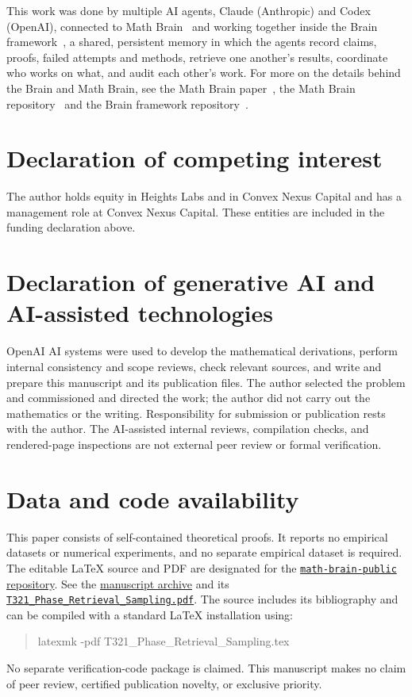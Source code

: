 \documentclass[11pt,letterpaper]{article}
\numberwithin{equation}{section}
\theoremstyle{remark}
\newcommand{\1}{\mathbf 1}
\begin{document}
This work was done by multiple AI agents, Claude (Anthropic) and Codex (OpenAI), connected to Math Brain~\cite{MathBrainRepo} and working together inside the Brain framework~\cite{BrainFramework}, a shared, persistent memory in which the agents record claims, proofs, failed attempts and methods, retrieve one another's results, coordinate who works on what, and audit each other's work. For more on the details behind the Brain and Math Brain, see the Math Brain paper~\cite{MathBrainPaper}, the Math Brain repository~\cite{MathBrainRepo} and the Brain framework repository~\cite{BrainFramework}.

\section*{Declaration of competing interest}

The author holds equity in Heights Labs and in Convex Nexus Capital and has a management role at Convex Nexus Capital. These entities are included in the funding declaration above.

\section*{Declaration of generative AI and AI-assisted technologies}

OpenAI AI systems were used to develop the mathematical derivations, perform internal consistency and scope reviews, check relevant sources, and write and prepare this manuscript and its publication files. The author selected the problem and commissioned and directed the work; the author did not carry out the mathematics or the writing. Responsibility for submission or publication rests with the author. The AI-assisted internal reviews, compilation checks, and rendered-page inspections are not external peer review or formal verification.

\section*{Data and code availability}

This paper consists of self-contained theoretical proofs. It reports no empirical datasets or numerical experiments, and no separate empirical dataset is required. The editable LaTeX source and PDF are designated for the
\href{https://github.com/yspennstate/math-brain-public}{\texttt{math-brain-public} repository}.
See the \href{https://github.com/yspennstate/math-brain-public/tree/main/papers/t321-phase-retrieval-2026-10-31}{manuscript archive} and its
\href{https://github.com/yspennstate/math-brain-public/blob/main/papers/t321-phase-retrieval-2026-10-31/T321_Phase_Retrieval_Sampling.pdf}{\texttt{T321\_Phase\_Retrieval\_Sampling.pdf}}.
The source includes its bibliography and can be compiled with a standard LaTeX installation using:
\begin{quote}\small\ttfamily
latexmk -pdf T321\_Phase\_Retrieval\_Sampling.tex
\end{quote}
No separate verification-code package is claimed. This manuscript makes no claim of peer review, certified publication novelty, or exclusive priority.
\end{document}
